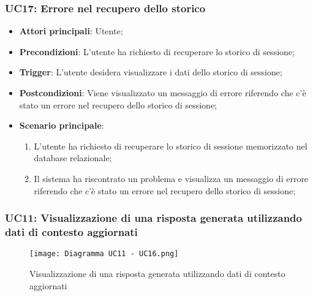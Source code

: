 \hypertarget{UC17}{}
\subsubsection{UC17: Errore nel recupero dello storico}

\begin{itemize}
    \item \textbf{Attori principali}: Utente;
    \item \textbf{Precondizioni}: L'utente ha richiesto di recuperare lo storico di sessione;
    \item \textbf{Trigger}: L'utente desidera visualizzare i dati dello storico di sessione;
    \item \textbf{Postcondizioni}: Viene visualizzato un messaggio di errore riferendo che c'è stato un errore nel recupero dello storico di sessione;
    \item \textbf{Scenario principale}: 
    \begin{enumerate}
        \item L'utente ha richiesto di recuperare lo storico di sessione memorizzato nel database relazionale;
        \item Il sistema ha riscontrato un problema e visualizza un messaggio di errore riferendo che c'è stato un errore nel recupero dello storico di sessione;
    \end{enumerate}
\end{itemize}


\newpage
\hypertarget{UC11}{}
\subsubsection{UC11: Visualizzazione di una risposta generata utilizzando dati di contesto aggiornati}

\begin{figure}[h]
    \centering
    \texttt{[image: Diagramma UC11 - UC16.png]}
    \caption{Visualizzazione di una risposta generata utilizzando dati di contesto aggiornati}
\end{figure}

